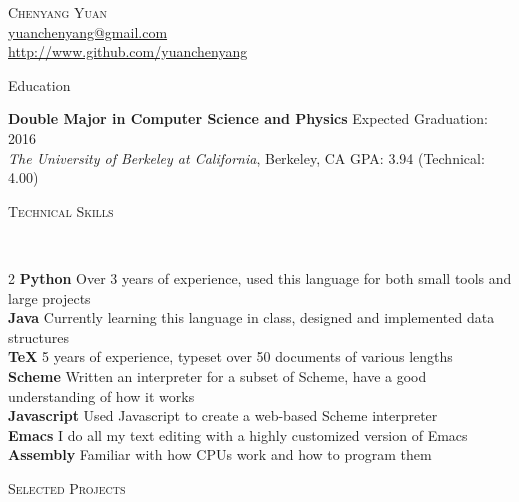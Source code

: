 \documentclass[9pt]{article}
\newenvironment{changemargin}[2]{%
  \begin{list}{}{%
      \setlength{\topsep}{0pt}%
      \setlength{\leftmargin}{#1}%
      \setlength{\rightmargin}{#2}%
      \setlength{\listparindent}{\parindent}%
      \setlength{\itemindent}{\parindent}%
      \setlength{\parsep}{\parskip}%
    }%
  \item[]}{\end{list}
}
\newcommand{\lineover}{
  \begin{changemargin}{-0.05in}{-0.05in}
    \vspace*{-8pt}
    \hrulefill \\
    \vspace*{-2pt}
  \end{changemargin}
}
\newcommand{\header}[1]{
  \begin{changemargin}{-0.5in}{-0.5in}
    \scshape{#1}\\
    \lineover
  \end{changemargin}
}
\newcommand{\contact}[4]{
  \begin{changemargin}{-0.5in}{-0.5in}
    \begin{center}
      {\Large \scshape {#1}}\\ \smallskip
      {#2}\\ \smallskip 
      {#3}\\ \smallskip
      {#4}\smallskip
    \end{center}
  \end{changemargin}
}
\newenvironment{body} {
  \vspace*{-16pt}
  \begin{changemargin}{-0.25in}{-0.5in}
  }	
  {\end{changemargin}
}
\begin{document}
\contact{Chenyang Yuan}{\href{mailto:yuanchenyang@gmail.com}{yuanchenyang@gmail.com}}{\url{http://www.github.com/yuanchenyang}}

\header{Education}

\begin{body}
  \vspace{14pt}
  \textbf{Double Major in Computer Science and Physics} \hfill Expected Graduation: 2016 \\
  \emph{The University of Berkeley at California}, Berkeley, CA{} \hfill GPA: 3.94 (Technical: 4.00)\\
\end{body}

\smallskip

\header{Technical Skills}

\begin{body}
  \vspace{14pt}
  \begin{multicols}{2}
    \textbf{Python} Over 3 years of experience, used this language for both small tools and large projects\\
    \textbf{Java} Currently learning this language in class, designed and implemented data structures \\
    \textbf{\TeX} 5 years of experience, typeset over 50 documents of various lengths\\
    \textbf{Scheme} Written an interpreter for a subset of Scheme, have a good understanding of how it works\\
    \textbf{Javascript} Used Javascript to create a web-based Scheme interpreter\\
    \textbf{Emacs} I do all my text editing with a highly customized version of Emacs\\
    \textbf{Assembly} Familiar with how CPUs work and how to program them\\
  \end{multicols}
\end{body}

\smallskip

\header{Selected Projects}
\end{document}
